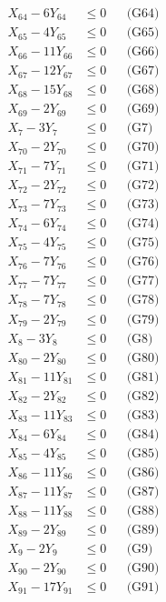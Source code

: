 \documentclass[a4paper,10pt]{article}
\begin{document}
{\begin{align}
X_{64} - 6Y_{64} &\leq 0 && \text{(G64)} \\
X_{65} - 4Y_{65} &\leq 0 && \text{(G65)} \\
X_{66} - 11Y_{66} &\leq 0 && \text{(G66)} \\
X_{67} - 12Y_{67} &\leq 0 && \text{(G67)} \\
X_{68} - 15Y_{68} &\leq 0 && \text{(G68)} \\
X_{69} - 2Y_{69} &\leq 0 && \text{(G69)} \\
X_{7} - 3Y_{7} &\leq 0 && \text{(G7)} \\
X_{70} - 2Y_{70} &\leq 0 && \text{(G70)} \\
X_{71} - 7Y_{71} &\leq 0 && \text{(G71)} \\
X_{72} - 2Y_{72} &\leq 0 && \text{(G72)} \\
X_{73} - 7Y_{73} &\leq 0 && \text{(G73)} \\
X_{74} - 6Y_{74} &\leq 0 && \text{(G74)} \\
X_{75} - 4Y_{75} &\leq 0 && \text{(G75)} \\
X_{76} - 7Y_{76} &\leq 0 && \text{(G76)} \\
X_{77} - 7Y_{77} &\leq 0 && \text{(G77)} \\
X_{78} - 7Y_{78} &\leq 0 && \text{(G78)} \\
X_{79} - 2Y_{79} &\leq 0 && \text{(G79)} \\
X_{8} - 3Y_{8} &\leq 0 && \text{(G8)} \\
X_{80} - 2Y_{80} &\leq 0 && \text{(G80)} \\
\allowbreak
X_{81} - 11Y_{81} &\leq 0 && \text{(G81)} \\
X_{82} - 2Y_{82} &\leq 0 && \text{(G82)} \\
X_{83} - 11Y_{83} &\leq 0 && \text{(G83)} \\
X_{84} - 6Y_{84} &\leq 0 && \text{(G84)} \\
X_{85} - 4Y_{85} &\leq 0 && \text{(G85)} \\
X_{86} - 11Y_{86} &\leq 0 && \text{(G86)} \\
X_{87} - 11Y_{87} &\leq 0 && \text{(G87)} \\
X_{88} - 11Y_{88} &\leq 0 && \text{(G88)} \\
X_{89} - 2Y_{89} &\leq 0 && \text{(G89)} \\
X_{9} - 2Y_{9} &\leq 0 && \text{(G9)} \\
X_{90} - 2Y_{90} &\leq 0 && \text{(G90)} \\
X_{91} - 17Y_{91} &\leq 0 && \text{(G91)} \\

\end{align}}
\end{document}
